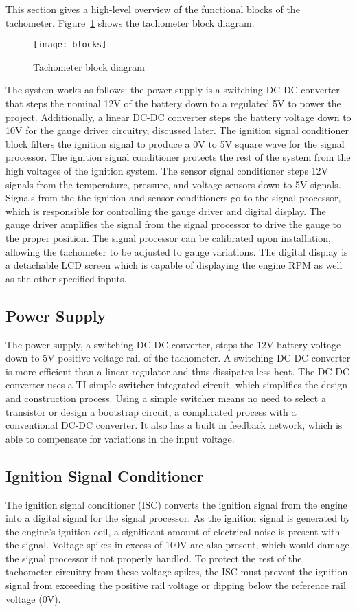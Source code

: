 This section gives a high-level overview of the functional blocks of the tachometer. Figure~\ref{fig:block} shows the tachometer block diagram.


\begin{figure}[H]
    \centering
    \texttt{[image: blocks]}
    \caption{Tachometer block diagram}
    \label{fig:block}
\end{figure}

The system works as follows: the power supply is a switching DC-DC converter that steps the nominal 12V of the battery down to a regulated 5V to power the project. Additionally, a linear DC-DC converter steps the battery voltage down to 10V for the gauge driver circuitry, discussed later. The ignition signal conditioner block filters the ignition signal to produce a 0V to 5V square wave for the signal processor. The ignition signal conditioner protects the rest of the system from the high voltages of the ignition system. The sensor signal conditioner steps 12V signals from the temperature, pressure, and voltage sensors down to 5V signals. Signals from the the ignition and sensor conditioners go to the signal processor, which is responsible for controlling the gauge driver and digital display. The gauge driver amplifies the signal from the signal processor to drive the gauge to the proper position. The signal processor can be calibrated upon installation, allowing the tachometer to be adjusted to gauge variations. The digital display is a detachable LCD screen which is capable of displaying the engine RPM as well as the other specified inputs.


\subsection{Power Supply}
The power supply, a switching DC-DC converter, steps the 12V battery voltage down to 5V positive voltage rail of the tachometer. A switching DC-DC converter is more efficient than a linear regulator and thus dissipates less heat. The DC-DC converter uses a TI simple switcher integrated circuit, which simplifies the design and construction process. Using a simple switcher means no need to select a transistor or design a bootstrap circuit, a complicated process with a conventional DC-DC converter. It also has a built in feedback network, which is able to compensate for variations in the input voltage. 


\subsection{Ignition Signal Conditioner}
The ignition signal conditioner (ISC) converts the ignition signal from the engine into a digital signal for the signal processor. As the ignition signal is generated by the engine's ignition coil, a significant amount of electrical noise is present with the signal. Voltage spikes in excess of 100V are also present, which would damage the signal processor if not properly handled. To protect the rest of the tachometer circuitry from these voltage spikes, the ISC must prevent the ignition signal from exceeding the positive rail voltage or dipping below the reference rail voltage (0V).

